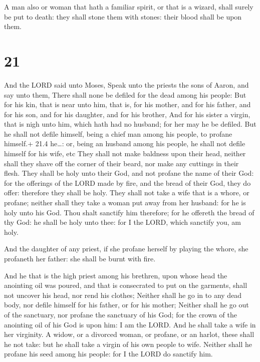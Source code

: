  A man also or woman that hath a familiar spirit, or that
is a wizard, shall surely be put to death: they shall stone them with
stones: their blood shall be upon them.

\hypertarget{section-20}{%
\section{21}\label{section-20}}

 And the LORD said unto Moses, Speak unto the priests the
sons of Aaron, and say unto them, There shall none be defiled for the
dead among his people:  But for his kin, that is near unto
him, that is, for his mother, and for his father, and for his son, and
for his daughter, and for his brother,  And for his sister a
virgin, that is nigh unto him, which hath had no husband; for her may he
be defiled.  But he shall not defile himself, being a chief
man among his people, to profane himself.+ 21.4 he\ldots: or, being an
husband among his people, he shall not defile himself for his wife, etc
 They shall not make baldness upon their head, neither shall
they shave off the corner of their beard, nor make any cuttings in their
flesh.  They shall be holy unto their God, and not profane
the name of their God: for the offerings of the LORD made by fire, and
the bread of their God, they do offer: therefore they shall be holy.
 They shall not take a wife that is a whore, or profane;
neither shall they take a woman put away from her husband: for he is
holy unto his God.  Thou shalt sanctify him therefore; for
he offereth the bread of thy God: he shall be holy unto thee: for I the
LORD, which sanctify you, am holy.

 And the daughter of any priest, if she profane herself by
playing the whore, she profaneth her father: she shall be burnt with
fire.

 And he that is the high priest among his brethren, upon
whose head the anointing oil was poured, and that is consecrated to put
on the garments, shall not uncover his head, nor rend his clothes;
 Neither shall he go in to any dead body, nor defile
himself for his father, or for his mother;  Neither shall
he go out of the sanctuary, nor profane the sanctuary of his God; for
the crown of the anointing oil of his God is upon him: I am the LORD.
 And he shall take a wife in her virginity.  A
widow, or a divorced woman, or profane, or an harlot, these shall he not
take: but he shall take a virgin of his own people to wife.
 Neither shall he profane his seed among his people: for I
the LORD do sanctify him.

